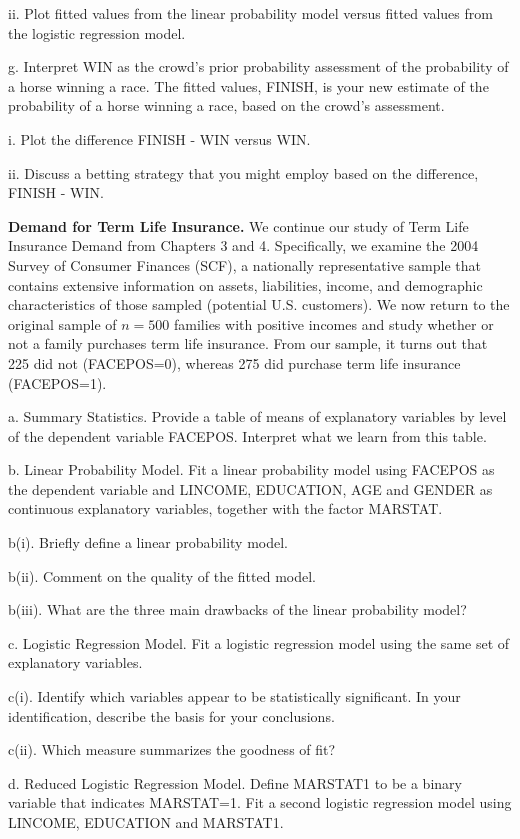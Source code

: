 \begin{exercises}
ii. Plot fitted values from the linear probability model versus
fitted values from the logistic regression model.

g. Interpret WIN as the crowd's prior probability assessment of the
probability of a horse winning a race. The fitted values, FINISH, is
your new estimate of the probability of a horse winning a race,
based on the crowd's assessment.

i. Plot the difference FINISH - WIN versus WIN.

ii. Discuss a betting strategy that you might employ based on the
difference, FINISH - WIN.


\item \textbf{Demand for Term Life Insurance.} We
continue our study of Term Life Insurance Demand from Chapters 3 and
4. Specifically, we examine the 2004 Survey of Consumer Finances
(SCF), a nationally representative sample that contains extensive
information on assets, liabilities, income, and demographic
characteristics of those sampled (potential U.S. customers). We now
return to the original sample of $n=500$ families with positive
incomes and study whether or not a family purchases term life
insurance. From our sample, it turns out that 225 did not
(FACEPOS=0), whereas 275 did purchase term life insurance
(FACEPOS=1).

a. Summary Statistics. Provide a table of means of explanatory
variables by level of the dependent variable FACEPOS. Interpret what
we learn from this table.


b. Linear Probability Model. Fit a linear probability model using
FACEPOS as the dependent variable and LINCOME, EDUCATION, AGE and
GENDER as continuous explanatory variables, together with the factor
MARSTAT.

b(i). Briefly define a linear probability model.

b(ii). Comment on the quality of the fitted model.

b(iii). What are the three main drawbacks of the linear probability
model?

c. Logistic Regression Model. Fit a logistic regression model using
the same set of explanatory variables.

c(i). Identify which variables appear to be statistically
significant. In your identification, describe the basis for your
conclusions.

c(ii). Which measure summarizes the goodness of fit?

d. Reduced Logistic Regression Model. Define MARSTAT1 to be a binary
variable that indicates MARSTAT=1. Fit a second logistic regression
model using LINCOME, EDUCATION and MARSTAT1.


\end{exercises}
